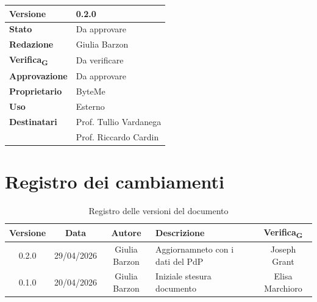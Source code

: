 \documentclass[11pt,a4paper]{article}
\newcommand{\gls}[1]{#1\textsubscript{G}}
\begin{document}
\begin{titlepage}
    \begin{table}[H]
        \centering
        \begin{tabular}{|l|p{5cm}|}
            \hline
            \textbf{Versione} & 0.2.0 \\
            \hline
            \textbf{Stato} & Da approvare \\
            \hline
            \textbf{Redazione} & Giulia Barzon \\
            \hline
            \textbf{\gls{Verifica}} & Da verificare \\
            \hline
            \textbf{Approvazione} & Da approvare \\
            \hline
            \textbf{Proprietario} & ByteMe \\
            \hline
            \textbf{Uso} & Esterno \\
            \hline
            \textbf{Destinatari} & Prof. Tullio Vardanega \\ & Prof. Riccardo Cardin \\
            \hline
        \end{tabular}
    \end{table}
    
    \vfill
\end{titlepage}

\section*{Registro dei cambiamenti}

\begin{table}[H]
    \centering
    \begin{tabularx}{\textwidth}{|c|c|c|>{\raggedright\arraybackslash}X|c|}
        \hline
        \textbf{Versione} & \textbf{Data} & \textbf{Autore} & \textbf{Descrizione} & \textbf{\gls{Verifica}} \\
        \hline
        0.2.0 & 29/04/2026 & Giulia Barzon & Aggiornamneto con i dati del PdP & Joseph Grant\\
        \hline
        0.1.0 & 20/04/2026 & Giulia Barzon & Iniziale stesura documento & Elisa Marchioro\\
        \hline
    \end{tabularx}
    \caption{Registro delle versioni del documento}
    \label{tab:versionamento}
\end{table}

\newpage

\tableofcontents
\thispagestyle{empty}
\newpage
\end{document}
